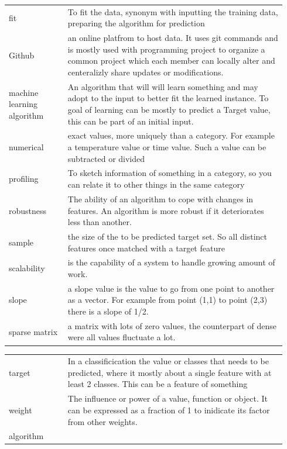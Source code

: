 \documentclass[a4paper,10pt]{article}
\begin{document}
\begin{tabular}{ p{0.20\linewidth} p{0.7437\linewidth} }
	fit & To fit the data, synonym with inputting the training data, preparing the algorithm for prediction\\ [1ex]
	
	Github & an online platfrom to host data. It uses git commands and is mostly used with programming project to organize a common project which each member can locally alter and centeralizly share updates or modifications. \\ [1ex]	
	
	machine learning algorithm & An algorithm that will will learn something and may adopt to the input to better fit the learned instance. To goal of learning can be mostly to predict a Target value, this can be part of an initial input.\\ [1ex]	
	
	numerical & exact values, more uniquely than a category. For example a temperature value or time value. Such a value can be subtracted or divided \\ [1ex]	
	
	profiling & To sketch information of something in a category, so you can relate it to other things in the same category\\ [1ex]
	
	robustness &  The ability of an algorithm to cope with changes in features. An algorithm is more robust if it deteriorates less than another. \\ [1ex]	
	
	sample & the size of the to be predicted target set. So all distinct features once matched with a target feature\\ [1ex]
	
	scalability & is the capability of a system to handle growing amount of work. \\[1ex]
	
	slope & a slope value is the value to go from one point to another as a vector. For example from point (1,1) to point (2,3) there is a slope of 1/2.\\[1ex]
	
	sparse matrix & a matrix with lots of zero values, the counterpart of dense were all values fluctuate a lot.	\\ [1ex]
	
\end{tabular}
\newpage
\begin{tabular}{ p{0.20\linewidth} p{0.7437\linewidth} }
	
	target & In a classificication the value or classes that needs to be predicted, where it mostly about a single feature with at least 2 classes. This can be a feature of something \\ [+1ex]
	
	
	
	weight & The influence or power of a value, function or object. It can be expressed as a fraction of 1 to inidicate its factor from other weights.	\\ [1ex]
	
	
	
	
	
	
	algorithm & \\ [1ex]	
	\end{tabular}
\end{document}
